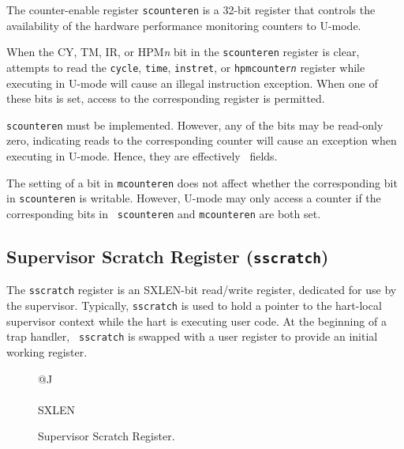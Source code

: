 The counter-enable register {\tt scounteren} is a 32-bit register that
controls the availability of the hardware performance monitoring counters to
U-mode.

When the CY, TM, IR, or HPM{\em n} bit in the {\tt scounteren} register is
clear, attempts to read the {\tt cycle}, {\tt time}, {\tt instret}, or
{\tt hpmcounter{\em n}} register while executing in U-mode
will cause an illegal instruction exception.  When one of these bits is set,
access to the corresponding register is permitted.

{\tt scounteren} must be implemented.  However, any of the bits may be
read-only zero, indicating reads to the corresponding counter will
cause an exception when executing in U-mode.
Hence, they are effectively \warl\ fields.

\begin{commentary}
The setting of a bit in {\tt mcounteren} does not affect whether the
corresponding bit in {\tt scounteren} is writable.
However, U-mode may only access a counter if the corresponding bits in {\tt
scounteren} and {\tt mcounteren} are both set.
\end{commentary}

\subsection{Supervisor Scratch Register ({\tt sscratch})}

The {\tt sscratch} register is an SXLEN-bit read/write register,
dedicated for use by the supervisor.  Typically, {\tt sscratch} is
used to hold a pointer to the hart-local supervisor context while the
hart is executing user code.  At the beginning of a trap handler, {\tt
  sscratch} is swapped with a user register to provide an initial
working register.

\begin{figure}[h!]
{\footnotesize
\begin{center}
\begin{tabular}{@{}J}
 \\
\hline
{} \\
\hline
SXLEN \\
\end{tabular}
\end{center}
}
\vspace{-0.1in}
\caption{Supervisor Scratch Register.}
\label{kregs}
\end{figure}


